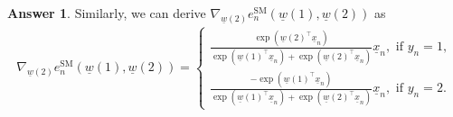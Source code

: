 \documentclass{article}
\theoremstyle{definition}
\newtheorem*{answer}{Answer}
\begin{document}
\begin{question}[start=0]
\begin{question}
\begin{answer}
			Similarly, we can derive $\nabla_{\!\underline{w}(2)}e^{\text{SM}}_{n}(\underline{w}(1), \underline{w}(2))$ as
			\begin{align*}
				\nabla_{\!\underline{w}(2)}e^{\text{SM}}_{n}(\underline{w}(1), \underline{w}(2)) = \begin{cases*}
					\frac{\exp(\underline{w}(2)^\top\underline{x}_n)}{\exp(\underline{w}(1)^\top\underline{x}_n) + \exp(\underline{w}(2)^\top\underline{x}_n)}\underline{x}_n,\text{ if }y_n=1,\\
					\frac{-\exp(\underline{w}(1)^\top\underline{x}_n)}{\exp(\underline{w}(1)^\top\underline{x}_n) + \exp(\underline{w}(2)^\top\underline{x}_n)}\underline{x}_n,\text{ if }y_n=2.
				\end{cases*}
			\end{align*}
		\end{answer}
		

\end{question}
\end{question}
\end{document}
